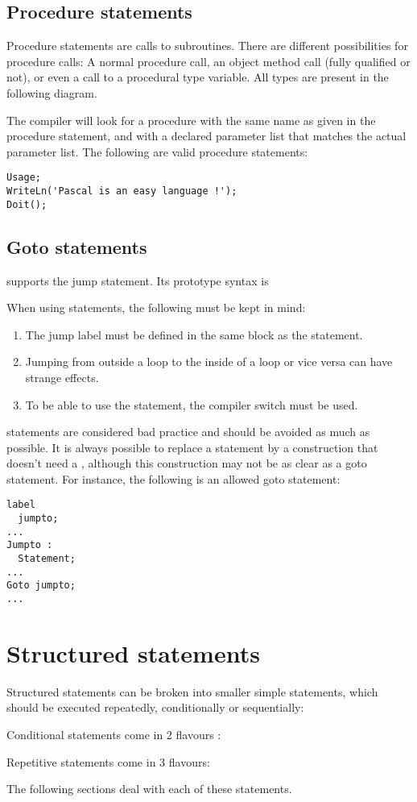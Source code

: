 \subsection{Procedure statements}
Procedure statements are calls to subroutines. There are
different possibilities for procedure calls: A normal procedure call, an
object method call (fully qualified or not), or even a call to a procedural
type variable. All types are present in the following diagram.

The \fpc compiler will look for a procedure with the same name as given in
the procedure statement, and with a declared parameter list that matches the
actual parameter list.
The following are valid procedure statements:
\begin{verbatim}
Usage;
WriteLn('Pascal is an easy language !');
Doit();
\end{verbatim}
\subsection{Goto statements}
\fpc supports the  jump statement. Its prototype syntax is

When using  statements, the following must be kept in mind:
\begin{enumerate}
\item The jump label must be defined in the same block as the 
statement.
\item Jumping from outside a loop to the inside of a loop or vice versa can
 have strange effects.
\item To be able to use the  statement, the  compiler
switch must be used.
\end{enumerate}
 statements are considered bad practice and should be avoided as
much as possible. It is always possible to replace a  statement by a
construction that doesn't need a , although this construction may
not be as clear as a goto statement.
For instance, the following is an allowed goto statement:
\begin{verbatim}
label
  jumpto;
...
Jumpto :
  Statement;
...
Goto jumpto;
...
\end{verbatim}

\section{Structured statements}
Structured statements can be broken into smaller simple statements, which
should be executed repeatedly, conditionally  or sequentially:

Conditional statements come in 2 flavours :

Repetitive statements come in 3 flavours:

The following sections deal with each of these statements.
